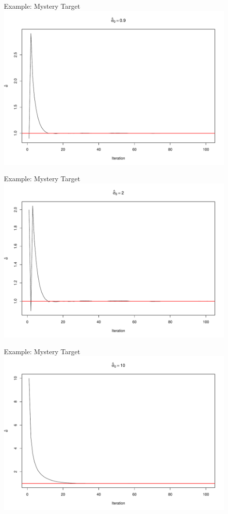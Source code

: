 \documentclass[14pt]{beamer}
\begin{document}
\begin{frame}{Example: Mystery Target}
    \centering
    \includegraphics[height=0.9\textheight, width=0.9\textwidth, keepaspectratio]{Figures/ESS Traj - 0,9.pdf}
\end{frame}

\begin{frame}{Example: Mystery Target}
    \centering
    \includegraphics[height=0.9\textheight, width=0.9\textwidth, keepaspectratio]{Figures/ESS Traj - 2.pdf}
\end{frame}

\begin{frame}{Example: Mystery Target}
    \centering
    \includegraphics[height=0.9\textheight, width=0.9\textwidth, keepaspectratio]{Figures/ESS Traj - 10.pdf}
\end{frame}
\end{document}
